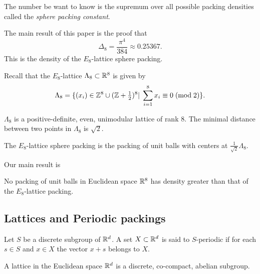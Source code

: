 \begin{definition}
The number be want to know is the supremum over all possible packing densities
called the \emph{sphere packing constant}.
\end{definition}

The main result of this paper is the proof that $$\Delta_8=\frac{\pi^4}{384}\approx 0.25367.$$
This is the density of the $E_8$-lattice sphere packing.
\begin{definition}Recall that the $E_8$-lattice $\Lambda_8\subset\mathbb{R}^8$ is given by
$$\Lambda_8=\{(x_i)\in\mathbb{Z}^8\cup(\mathbb{Z}+\textstyle\frac12\displaystyle )^8|\;\sum_{i=1}^8x_i\equiv 0\;(\mathrm{mod\;2})\}.$$
\end{definition}
\begin{lemma}$\Lambda_8$ is a positive-definite, even, unimodular lattice of rank 8. The minimal distance between two points in $\Lambda_8$ is $\sqrt{2}$.
\end{lemma}
\begin{definition}
The $E_8$-lattice sphere packing is the packing of unit balls with centers at $\frac{1}{\sqrt{2}}\Lambda_8.$
\end{definition}
Our main result is
\begin{theorem}\label{thm: main}
No packing of unit balls
in Euclidean space $\mathbb{R}^8$ has density greater than that of the $E_8$-lattice packing.
\end{theorem}

\subsection{Lattices and Periodic packings}
\begin{definition} Let $S$ be a discrete subgroup of $\mathbb{R}^d$. A set $X\subset\mathbb{R}^d$ is said to $S$-periodic if for each $s\in S$ and $x\in X$ the vector $x+s$ belongs to $X$.
\end{definition}

\begin{definition} A lattice in the Euclidean space $\mathbb{R}^d$ is a discrete, co-compact,  abelian subgroup.
\end{definition}

